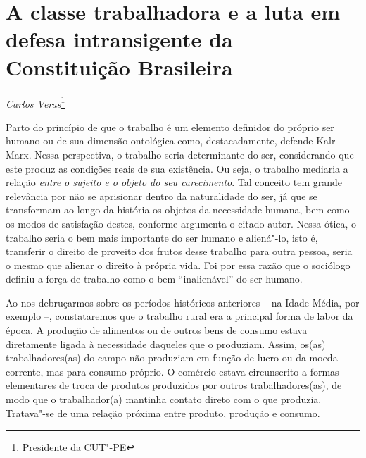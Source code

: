 \chapter{A classe trabalhadora e a luta em defesa intransigente da
Constituição Brasileira}

\begin{flushright}
\emph{Carlos Veras}\footnote{Presidente da CUT"-PE}
\end{flushright}

Parto do princípio de que o trabalho é um elemento definidor do próprio
ser humano ou de sua dimensão ontológica como, destacadamente, defende
Kalr Marx. Nessa perspectiva, o trabalho seria determinante do ser,
considerando que este produz as condições reais de sua existência. Ou
seja, o trabalho mediaria a relação \emph{entre o sujeito e o objeto do
seu carecimento}. Tal conceito tem grande relevância por não se
aprisionar dentro da naturalidade do ser, já que se transformam ao longo
da história os objetos da necessidade humana, bem como os modos de
satisfação destes, conforme argumenta o citado autor. Nessa ótica, o
trabalho seria o bem mais importante do ser humano e aliená"-lo, isto é,
transferir o direito de proveito dos frutos desse trabalho para outra
pessoa, seria o mesmo que alienar o direito à própria vida. Foi por essa
razão que o sociólogo definiu a força de trabalho como o bem
``inalienável'' do ser humano.

Ao nos debruçarmos sobre os períodos históricos anteriores -- na Idade
Média, por exemplo --, constataremos que o trabalho rural era a
principal forma de labor da época. A produção de alimentos ou de outros
bens de consumo estava diretamente ligada à necessidade daqueles que o
produziam. Assim, os(as) trabalhadores(as) do campo não produziam em
função de lucro ou da moeda corrente, mas para consumo próprio. O
comércio estava circunscrito a formas elementares de troca de produtos
produzidos por outros trabalhadores(as), de modo que o trabalhador(a)
mantinha contato direto com o que produzia. Tratava"-se de uma relação
próxima entre produto, produção e consumo.

